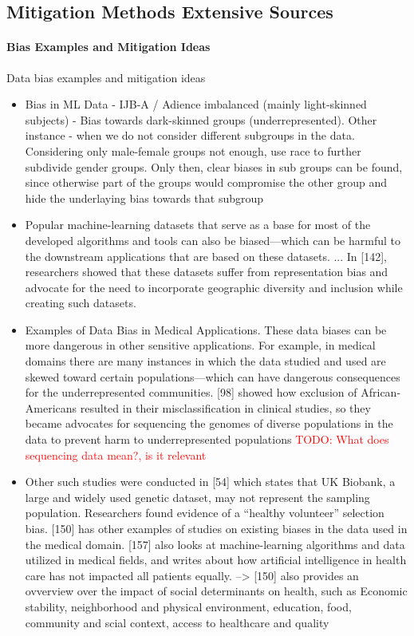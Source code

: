 \documentclass[12pt, a4paper, oneside]{book}   	%
\renewcommand{\todo}[1]{\textcolor{red}{TODO: #1}}
\newif\ifrawcitationactive
\newcommand{\rawcitationstart}{\color{purple}\rawcitationactivetrue}
\begin{document}
		\rawcitationstart
		\subsection{Mitigation Methods Extensive Sources}
			
			\paragraph{Bias Examples and Mitigation Ideas}
			Data bias examples and mitigation ideas
			\begin{itemize}
				\item Bias in ML Data - \autocite{M24_Buolamwini_2018} IJB-A / Adience imbalanced (mainly light-skinned subjects) - Bias towards dark-skinned groups (underrepresented). Other instance - when we do not consider different subgroups in the data. Considering only male-female groups not enough, use race to further subdivide gender groups. Only then, clear biases in sub groups can be found, since otherwise part of the groups would  compromise the other group and hide the underlaying bias towards that subgroup \autocite{Mehrabi_2021}
				\item Popular machine-learning datasets that serve as a base for most of the developed algorithms and tools can also be biased—which can be harmful to the downstream applications that are based on these datasets. ... In [142], researchers showed that these datasets suffer from representation bias and advocate for the need to incorporate geographic diversity and inclusion while creating such datasets. \autocite{Mehrabi_2021}
				\item Examples of Data Bias in Medical Applications. These data biases can be more dangerous in other sensitive applications. For example, in medical domains there are many instances in which the data studied and used are skewed toward certain populations—which can have dangerous consequences for the underrepresented communities. [98] showed how exclusion of African-Americans resulted in their misclassification in clinical studies, so they became advocates for sequencing the genomes of diverse populations in the data to prevent harm to underrepresented populations \autocite{Mehrabi_2021} \todo{What does sequencing data mean?, is it relevant}
				\item Other such studies were conducted in [54] which states that UK Biobank, a large and widely used genetic dataset, may not represent the sampling population. Researchers found evidence of a “healthy volunteer” selection bias. [150] has other examples of studies on existing biases in the data used in the medical domain. [157] also looks at machine-learning algorithms and data utilized in medical fields, and writes about how artificial intelligence in health care has not impacted all patients equally.\autocite{Mehrabi_2021} --> [150] also provides an ovverview over the impact of social determinants on health, such as Economic stability, neighborhood and physical environment, education, food, community and scial context, access to healthcare and quality
			\end{itemize}
			
\end{document}
